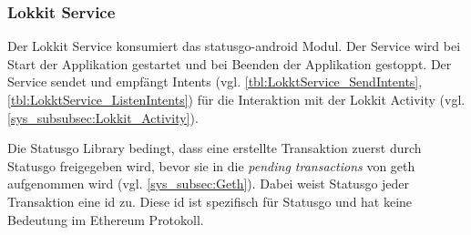 \subsubsection{Lokkit Service}
Der Lokkit Service konsumiert das statusgo-android Modul. Der Service wird bei Start der Applikation gestartet und bei Beenden der Applikation gestoppt. Der Service sendet und empfängt Intents (vgl. \ref{tbl:LokktService_SendIntents}, \ref{tbl:LokktService_ListenIntents}) für die Interaktion mit der Lokkit Activity (vgl. \ref{sys_subsubsec:Lokkit_Activity}).\cite[Bound Services]{developer.android.com}

Die Statusgo Library bedingt, dass eine erstellte Transaktion zuerst durch Statusgo freigegeben wird, bevor sie in die \emph{pending transactions} von geth aufgenommen wird (vgl. \ref{sys_subsec:Geth}). Dabei weist Statusgo jeder Transaktion eine id zu. Diese id ist spezifisch für Statusgo und hat keine Bedeutung im Ethereum Protokoll.

